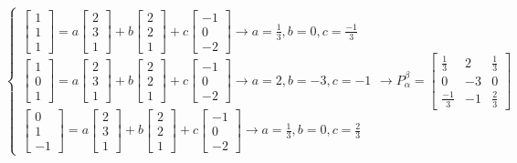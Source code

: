 $
\begin{cases}
	\begin{bmatrix}
		1 \\ 1 \\ 1
	\end{bmatrix} = a\begin{bmatrix}
	2 \\ 3 \\ 1
	\end{bmatrix} + b\begin{bmatrix}
	2 \\ 2 \\ 1
	\end{bmatrix} + c\begin{bmatrix}
	-1 \\ 0 \\ -2
	\end{bmatrix} \longrightarrow a=\frac{1}{3} , b = 0 , c = \frac{-1}{3}
	 \\ 
	\begin{bmatrix}
	1 \\ 0 \\ 1
	\end{bmatrix} = a\begin{bmatrix}
	2 \\ 3 \\ 1
	\end{bmatrix} + b\begin{bmatrix}
	2 \\ 2 \\ 1
	\end{bmatrix} + c\begin{bmatrix}
	-1 \\ 0 \\ -2	
	\end{bmatrix} \longrightarrow a=2 , b = -3 , c = -1
	\\
	\begin{bmatrix}
		0 \\ 1 \\ -1
	\end{bmatrix} = a\begin{bmatrix}
		2 \\ 3 \\ 1
	\end{bmatrix} + b\begin{bmatrix}
		2 \\ 2 \\ 1
	\end{bmatrix} + c\begin{bmatrix}
		-1 \\ 0 \\ -2	
	\end{bmatrix} \longrightarrow a=\frac{1}{3} , b = 0 , c = \frac{2}{3}
\end{cases}	 \longrightarrow P^\beta_\alpha = \begin{bmatrix}
\frac{1}{3} & 2 & \frac{1}{3} \\
0 & -3 & 0 \\
\frac{-1}{3} & -1 & \frac{2}{3}
\end{bmatrix}
$

